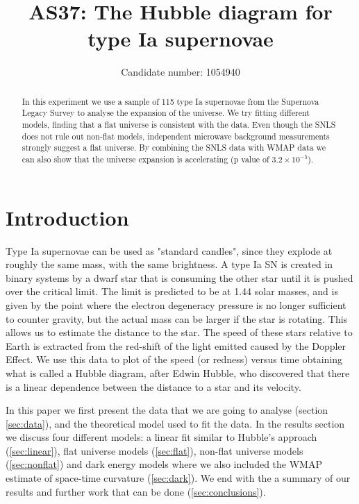 \documentclass[11pt]{article}
\title{AS37: The Hubble diagram for type Ia supernovae}
\author{Candidate number: 1054940}
\begin{document}
\maketitle


\begin{abstract}
In this experiment we use a sample of 115 type Ia supernovae from the Supernova Legacy Survey to analyse the expansion of the universe. We try fitting different models, finding that a flat universe is consistent with the data. Even though the SNLS does not rule out non-flat models, independent microwave background measurements strongly suggest a flat universe. By combining the SNLS data with WMAP data we can also show that the universe expansion is accelerating (p value of $3.2 \times 10^{-5}$). 
\end{abstract}


\section{Introduction}
Type Ia supernovae can be used as "standard candles", since they explode at roughly the same mass, with the same brightness. A type Ia SN is created in binary systems by a dwarf star that is consuming the other star until it is pushed over the critical limit. The limit is predicted to be at 1.44 solar masses, and is given by the point where the electron degeneracy pressure is no longer sufficient to counter gravity, but the actual mass can be larger if the star is rotating. This allows us to estimate the distance to the star. The speed of these stars relative to Earth is extracted from the red-shift of the light emitted caused by the Doppler Effect. We use this data to plot of the speed (or redness) versus time obtaining what is called a Hubble diagram, after Edwin Hubble, who discovered that there is a linear dependence between the distance to a star and its velocity. 

In this paper we first present the data that we are going to analyse (section \ref{sec:data}), and the theoretical model used to fit the data. In the results section we discuss four different models: a linear fit similar to Hubble's approach (\ref{sec:linear}), flat universe models (\ref{sec:flat}), non-flat universe models (\ref{sec:nonflat}) and dark energy models where we also included the WMAP estimate of space-time curvature (\ref{sec:dark}). We end with the a summary of our results and further work that can be done (\ref{sec:conclusions}). 
\end{document}
